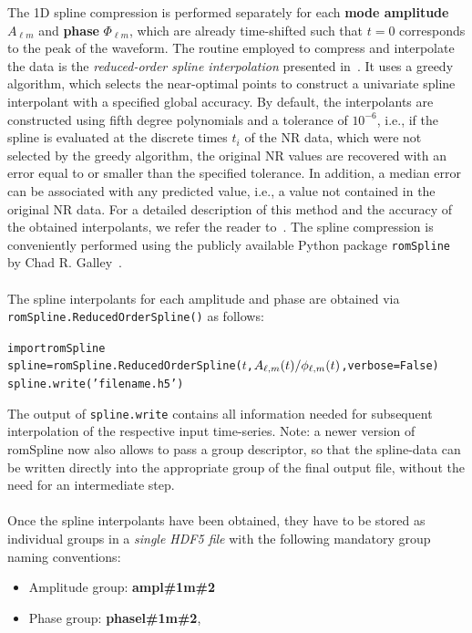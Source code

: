\documentclass[11pt,tightenlines,article,amssymb,amsmath,amsfonts,superscriptaddress]{revtex4}
\begin{document}
The 1D spline compression is performed separately for each {\bf mode amplitude} $A_{\ell m}$ and {\bf phase} $\Phi_{\ell m}$, which are
already time-shifted such that $t=0$ corresponds to the peak of the waveform. The routine employed to compress and interpolate the data is the \emph{reduced-order spline interpolation} presented in~\cite{Galley:2016aa}. It uses a greedy algorithm, which selects the near-optimal points to construct a univariate spline interpolant with a specified global accuracy.
By default, the interpolants are constructed using fifth degree polynomials and a tolerance of $10^{-6}$,
i.e., if the spline is evaluated at the discrete times $t_i$ of the NR data, which were not selected by the greedy algorithm, the original NR values are recovered with an error equal to or smaller than the specified tolerance. In addition, a median error can be associated with any predicted value, i.e., a value not contained in the original NR data. 
For a detailed description of this method and the accuracy of the obtained interpolants, we refer the reader to~\cite{Galley:2016aa}. The spline compression is conveniently performed using the publicly available Python package \texttt{romSpline} by Chad R. Galley~\cite{romspline}. \\
\\The spline interpolants for each amplitude and phase are obtained via \verb"romSpline.ReducedOrderSpline()" as follows: 
\begin{alltt}
import romSpline 
spline = romSpline.ReducedOrderSpline(\(t\), \(A\sb{\ell,m}(t)/\phi\sb{\ell,m}(t)\), verbose=False)
spline.write('filename.h5')
\end{alltt}
The output of \texttt{spline.write} contains all information needed for subsequent interpolation of the respective input time-series. 
Note: a newer version of romSpline now also allows to pass a group descriptor, so that the spline-data can be written directly into the appropriate group of the final output file, without the need for an intermediate step.\\
\\Once the spline interpolants have been obtained, they have to be stored as individual groups in a \emph{single HDF5 file} with the following mandatory group naming conventions: 
\begin{itemize}
  \item Amplitude group: \textbf{amp\textunderscore l\#1\textunderscore m\#2}
  \item Phase group: \textbf{phase\textunderscore  l\#1\textunderscore m\#2},
\end{itemize}
\end{document}

